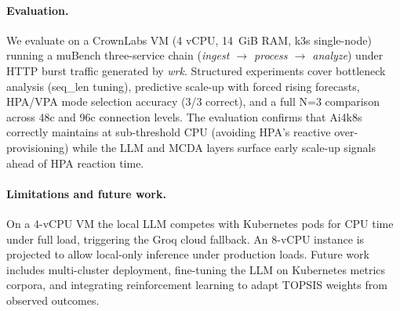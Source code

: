 \paragraph{Evaluation.}
We evaluate on a CrownLabs VM (4 vCPU, 14~GiB RAM, k3s single-node) running a
muBench three-service chain (\textit{ingest $\to$ process $\to$ analyze}) under
HTTP burst traffic generated by \textit{wrk}. Structured experiments cover bottleneck
analysis (seq\_len tuning), predictive scale-up with forced rising forecasts, HPA/VPA
mode selection accuracy (3/3 correct), and a full N=3 comparison across 48c and 96c
connection levels. The evaluation confirms that Ai4k8s correctly maintains at
sub-threshold CPU (avoiding HPA's reactive over-provisioning) while the LLM and
MCDA layers surface early scale-up signals ahead of HPA reaction time.

\paragraph{Limitations and future work.}
On a 4-vCPU VM the local LLM competes with Kubernetes pods for CPU time under full
load, triggering the Groq cloud fallback. An 8-vCPU instance is projected to allow
local-only inference under production loads. Future work includes multi-cluster
deployment, fine-tuning the LLM on Kubernetes metrics corpora, and integrating
reinforcement learning to adapt TOPSIS weights from observed outcomes.

